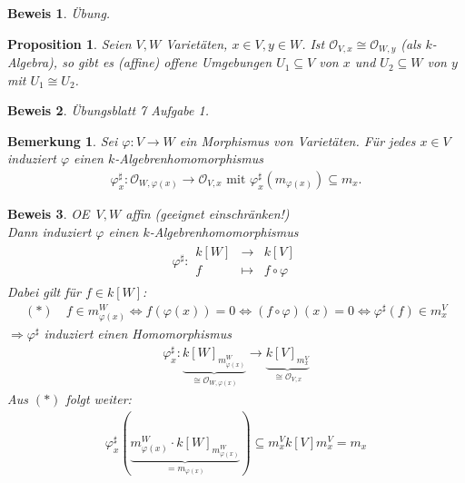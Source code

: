 \documentclass[a4paper,12pt]{report}
\theoremstyle{break}
\newtheorem{Bem}[Def]{Bemerkung}
\newtheorem{Prop}[Def]{Proposition}
\theoremstyle{nonumberbreak}
\theoremstyle{nonumberplain}
\newtheorem{Bew}{Beweis}
\newcommand{\Abb}[5]{\ensuremath{#1:\begin{array}{ccc} #2 & \longrightarrow & #3 \\ #4 & \longmapsto & #5 \end{array}}}
\renewcommand{\OE}{O\!\!E}
\begin{document}
\begin{Bew}
  Übung.
\end{Bew}
\begin{Prop}
  \label{prop:14.3}
  Seien $V,W$ Varietäten, $x\in V, y\in W$. Ist $\mathcal{O}_{V,x}\cong\mathcal{O}_{W,y}$ (als $k$-Algebra), so gibt es (affine)
  offene Umgebungen $U_1\subseteq V$ von $x$ und $U_2\subseteq W$ von $y$ mit $U_1\cong U_2$.
\end{Prop}
\begin{Bew}
  Übungsblatt 7 Aufgabe 1.
\end{Bew}
\begin{Bem}
  \label{bem:14.4}
  Sei $\varphi :V\longrightarrow W$ ein Morphismus von Varietäten. Für jedes $x\in V$ induziert $\varphi$ einen
  $k$-Algebrenhomomorphismus
  \begin{align*}
    \varphi_x^\sharp:\mathcal{O}_{W,\varphi(x)}\longrightarrow \mathcal{O}_{V,x} \text{ mit } \varphi_x^\sharp(m_{\varphi(x)})\subseteq m_x.
  \end{align*}
\end{Bem}
\begin{Bew}
  \OE \ $V,W$ affin (geeignet einschränken!) \\ Dann induziert $\varphi$ einen $k$-Algebrenhomomorphismus
  \begin{align*}
    \Abb{\varphi^\sharp}{k[W]}{k[V]}{f}{f\circ\varphi}
  \end{align*}
  Dabei gilt für $f\in k[W]$:
  \begin{align*}
    (*) \quad f\in m_{\varphi(x)}^{W}\Leftrightarrow f(\varphi(x))=0\Leftrightarrow (f\circ\varphi)(x)=0\Leftrightarrow\varphi^\sharp(f)\in m_x^V
  \end{align*}
  $\Rightarrow\varphi^\sharp$ induziert einen Homomorphismus
  \begin{align*}
    \varphi_x^\sharp:\underbrace{k[W]_{m_{\varphi(x)}^W}}_{\cong\mathcal{O}_{W,\varphi(x)}}\longrightarrow \underbrace{k[V]_{m_x^V}}_{\cong\mathcal{O}_{V,x}}
  \end{align*}
  Aus $(*)$ folgt weiter:
  \begin{align*}
    \varphi_x^\sharp ( \underbrace{m_{\varphi(x)}^W\cdot k[W]_{m_{\varphi(x)}^W}}_{=m_{\varphi(x)}} ) \subseteq m_x^V k[V] m_x^V = m_x
  \end{align*}
\end{Bew}
\end{document}
